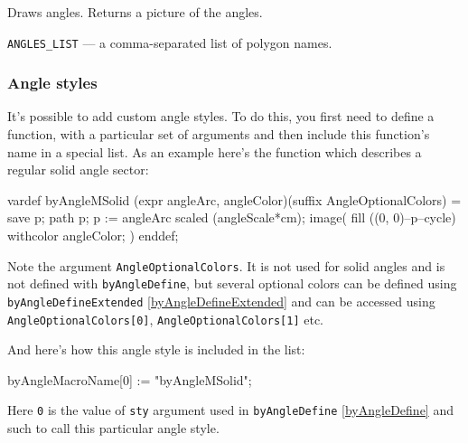 \documentclass{ltxdoc}
\begin{document}
	Draws angles. Returns a picture of the angles.
	
	\texttt{ANGLES\_LIST} — a comma-separated list of polygon names.


\subsubsection{Angle styles}\label{AngleStyles}

	It's possible to add custom angle styles. To do this, you first need to define a function, with a particular set of arguments and then include this function's name in a special list. As an example here's the function which describes a regular solid angle sector:
	
\begin{MetaPostCode}
vardef byAngleMSolid (expr angleArc, angleColor)(suffix AngleOptionalColors) =
    save p;
    path p;
    p := angleArc scaled (angleScale*cm);
    image(
        fill ((0, 0)--p--cycle) withcolor angleColor;
    )
enddef;
\end{MetaPostCode}

	Note the argument \texttt{AngleOptionalColors}. It is not used for solid angles and is not defined with \texttt{byAngleDefine}, but several optional colors can be defined using \texttt{byAngleDefineExtended} \ref{byAngleDefineExtended} and can be accessed using \texttt{AngleOptionalColors[0]}, \texttt{AngleOptionalColors[1]} etc.

	And here's how this angle style is included in the list:

\begin{MetaPostCode}
byAngleMacroName[0] := "byAngleMSolid";
\end{MetaPostCode}

	Here \texttt{0} is the value of \texttt{sty} argument used in \texttt{byAngleDefine} \ref{byAngleDefine} and such to call this particular angle style.

\end{document}
